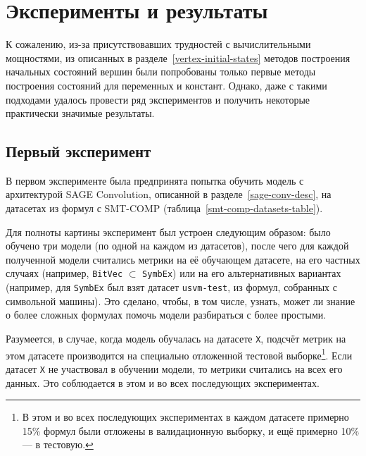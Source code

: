\newpage

\section{Эксперименты и результаты}

К сожалению, из-за присутствовавших трудностей с вычислительными мощностями, из описанных в разделе~\ref{vertex-initial-states} методов построения начальных состояний вершин были попробованы только первые методы построения состояний для переменных и констант. Однако, даже с такими подходами удалось провести ряд экспериментов и получить некоторые практически значимые результаты.

\subsection{Первый эксперимент}

В первом эксперименте была предпринята попытка обучить модель с архитектурой SAGE Convolution, описанной в разделе~\ref{sage-conv-desc}, на датасетах из формул с SMT-COMP (таблица~\ref{smt-comp-datasets-table}).

Для полноты картины эксперимент был устроен следующим образом: было обучено три модели (по одной на каждом из датасетов), после чего для каждой полученной модели считались метрики на её обучающем датасете, на его частных случаях (например, \texttt{BitVec} $\subset$ \texttt{SymbEx}) или на его альтернативных вариантах (например, для \texttt{SymbEx} был взят датасет \texttt{usvm-test}, из формул, собранных с символьной машины). Это сделано, чтобы, в том числе, узнать, может ли знание о более сложных формулах помочь модели разбираться с более простыми.

Разумеется, в случае, когда модель обучалась на датасете \texttt{X}, подсчёт метрик на этом датасете производится на специально отложенной тестовой выборке\footnote{В этом и во всех последующих экспериментах в каждом датасете примерно 15\% формул были отложены в валидационную выборку, и ещё примерно 10\% --- в тестовую.}. Если датасет \texttt{X} не участвовал в обучении модели, то метрики считались на всех его данных. Это соблюдается в этом и во всех последующих экспериментах.

